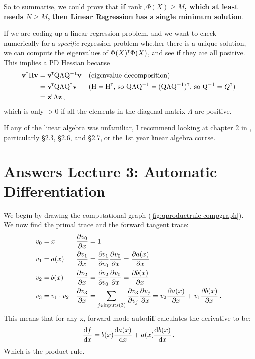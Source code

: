 So to summarise, we could prove that \textbf{if $\mathrm{rank}\,, \Phi(X) \geq M$, which at least needs $N\geq M$, then Linear Regression has a single minimum solution}.

If we are coding up a linear regression problem, and we want to check numerically for a \emph{specific} regression problem whether there is a unique solution, we can compute the eigenvalues of $\Phi(X)\transpose\Phi(X)$, and see if they are all positive. This implies a PD Hessian because
\begin{align}
\vv\transpose \mat H \vv &= \vv\transpose \mat Q \mat \Lambda \mat Q\inv \vv && \text{(eigenvalue decomposition)} \\
&= \vv\transpose \mat Q \mat \Lambda \mat Q\transpose\vv && \text{($\mat H = \mat H\transpose$, so $\mat Q\mat \Lambda \mat Q\inv = (\mat Q\mat \Lambda \mat Q\inv)\transpose$, so $\mat Q\inv = Q\transpose$)}\\
&= \vz\transpose \Lambda \vz \,,
\end{align}
which is only $> 0$ if all the elements in the diagonal matrix $\Lambda$ are positive.

If any of the linear algebra was unfamiliar, I recommend looking at chapter 2 in \citet{mml}, particularly \S2.3, \S2.6, and \S2.7, or the 1st year linear algebra course.


\section{Answers Lecture 3: Automatic Differentiation}



\paragraph{}
We begin by drawing the computational graph (\cref{fig:qproductrule-compgraph}). %
We now find the primal trace and the forward tangent trace:
\begin{align}
v_0 &= x && \pderiv[v_0]{x} = 1 \\
v_1 &= a(x) && \pderiv[v_1]{x} = \pderiv[v_1]{v_0}\pderiv[v_0]{x} = \pderiv[a(x)]{x} \\
v_2 &= b(x) && \pderiv[v_2]{x} = \pderiv[v_2]{v_0}\pderiv[v_0]{x} = \pderiv[b(x)]{x} \\
v_3 &= v_1 \cdot v_2 && \pderiv[v_3]{x} = \sum_{j \in \mathrm{inputs}(3)}\pderiv[v_3]{v_j}\pderiv[v_j]{x} = v_2\pderiv[a(x)]{x} + v_1\pderiv[b(x)]{x} \,.
\end{align}
This means that for any x, forward mode autodiff calculates the derivative to be:
\begin{align}
\deriv[f]{x} = b(x)\deriv[a(x)]{x} + a(x)\deriv[b(x)]{x} \,.
\end{align}
Which is the product rule.

